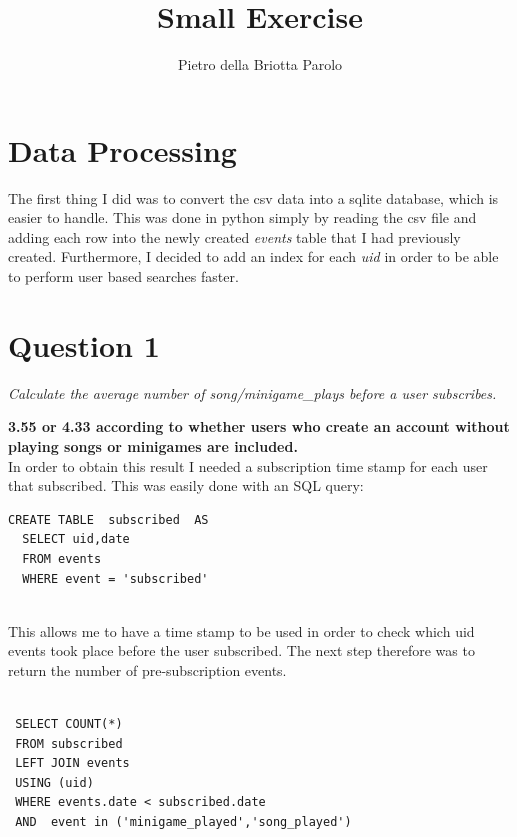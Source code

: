 \documentclass[paper=a4, fontsize=11pt]{report}
\title{Small Exercise}
\author{Pietro della Briotta Parolo}
\date{}
\begin{document}
\maketitle
\section*{Data Processing}

The first thing I did was to convert the csv data into a sqlite database, which is easier to handle. This was done in python
simply by reading the csv file and adding each row into the newly created \textit{events} table that I had previously created. Furthermore,
I decided to add an index for each \textit{uid} in order to be able to perform user based searches faster.

\section*{Question 1}

\textit{ Calculate the average number of song/minigame\_plays before a user 
subscribes.}

\textbf{3.55 or 4.33 according to whether users who create an account without playing songs or minigames are included.}\\

In order to obtain this result I needed a subscription time stamp for each user that subscribed. This was easily done with an SQL query:



\begin{lstlisting}[frame=single,caption=Generate subscription table \label{code:sub_table}]
  CREATE TABLE  subscribed  AS
  SELECT uid,date
  FROM events
  WHERE event = 'subscribed'
        
\end{lstlisting} 

This allows me to have a time stamp to be used in order to check which uid events took place before the user subscribed. The next step therefore was to return the number of pre-subscription events.

\begin{lstlisting}[frame=single,caption=Return pre-sub events \label{code:pre_sub_table}]

 SELECT COUNT(*) 
 FROM subscribed 
 LEFT JOIN events
 USING (uid)
 WHERE events.date < subscribed.date
 AND  event in ('minigame_played','song_played')

\end{lstlisting}
\end{document}
